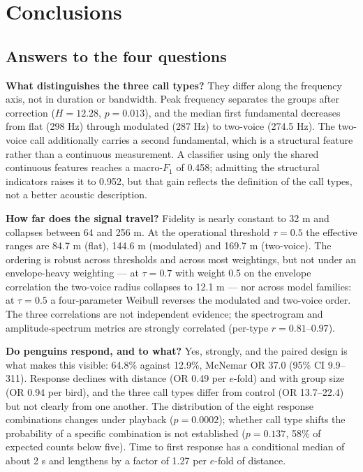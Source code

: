\section{Conclusions}\label{sec:conclusion}

\subsection{Answers to the four questions}

\textbf{What distinguishes the three call types?} They differ along the frequency axis, not in
duration or bandwidth. Peak frequency separates the groups after correction ($H=12.28$,
$p=0.013$), and the median first fundamental decreases from flat (298 Hz) through modulated
(287 Hz) to two-voice (274.5 Hz). The two-voice call additionally carries a second fundamental,
which is a structural feature rather than a continuous measurement. A classifier using only the
shared continuous features reaches a macro-$F_1$ of 0.458; admitting the structural indicators
raises it to 0.952, but that gain reflects the definition of the call types, not a better
acoustic description.

\textbf{How far does the signal travel?} Fidelity is nearly constant to 32 m and collapses
between 64 and 256 m. At the operational threshold $\tau=0.5$ the effective ranges are 84.7 m
(flat), 144.6 m (modulated) and 169.7 m (two-voice). The ordering is robust across thresholds and
across most weightings, but not under an envelope-heavy weighting --- at $\tau=0.7$ with weight
0.5 on the envelope correlation the two-voice radius collapses to 12.1 m --- nor across model
families: at $\tau=0.5$ a four-parameter Weibull reverses the modulated and two-voice order. The
three correlations are not independent evidence; the spectrogram and amplitude-spectrum metrics
are strongly correlated (per-type $r=0.81$--$0.97$).

\textbf{Do penguins respond, and to what?} Yes, strongly, and the paired design is what makes
this visible: 64.8\% against 12.9\%, McNemar OR 37.0 (95\% CI 9.9--311). Response declines with
distance (OR 0.49 per $e$-fold) and with group size (OR 0.94 per bird), and the three call types
differ from control (OR 13.7--22.4) but not clearly from one another. The distribution of the
eight response combinations changes under playback ($p=0.0002$); whether call type shifts the
probability of a specific combination is not established ($p=0.137$, 58\% of expected counts
below five). Time to first response has a conditional median of about 2 s and lengthens by a
factor of 1.27 per $e$-fold of distance.

